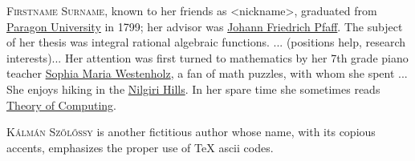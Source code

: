 \begin{tocaboutauthors}
\begin{tocabout}[surname]  %
  \textsc{Firstname Surname}, known to her friends as <nickname>,
  graduated from
  \href{https://en.wikipedia.org/wiki/URL}{Paragon University} in
  1799; her advisor was
  \href{https://en.wikipedia.org/wiki/Johann_Friedrich_Pfaff}{Johann
    Friedrich Pfaff}. The subject of her thesis was integral rational
    algebraic functions.  ... (positions help, research interests)...
    Her attention was first turned to mathematics by her 7th grade
    piano teacher \href{http://url}{Sophia Maria Westenholz},
    a fan of math puzzles, with whom she spent ...  
    She enjoys hiking in the
   \href{https://en.wikipedia.org/wiki/Nilgiri_Mountains/}{Nilgiri Hills}.
    In her spare time she sometimes reads
  \href{http://theoryofcomputing.org}{\textsf{Theory of Computing}}.
\end{tocabout}
\begin{tocabout}[szolossy]
\textsc{K\'alm\'an Sz\H{o}l\H{o}ssy} is another fictitious author
whose name, with its copious accents, emphasizes the proper use
of TeX ascii codes.
\end{tocabout}
\end{tocaboutauthors}



